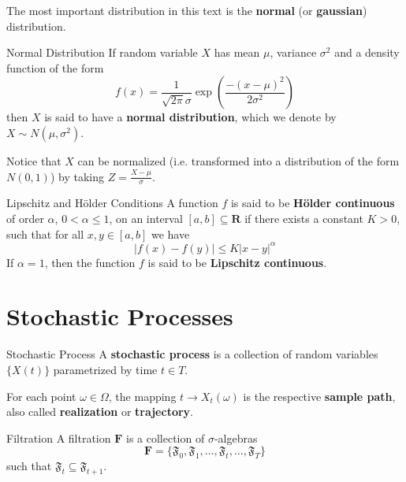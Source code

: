 
The most important distribution in this text is the \textbf{normal} (or \textbf{gaussian}) distribution.
 
\begin{definition}[]{Normal Distribution}{}
	If random variable $X$ has mean $\mu$, variance $\sigma^2$ and a density function of the form
	\[
		f(x) = \frac{1}{\sqrt{2\pi} \sigma} \exp \left( \frac{-(x-\mu)^2}{2\sigma^2} \right) 
	\]
	then $X$ is said to have a \textbf{normal distribution}, which we denote by $X \sim N(\mu, \sigma^2)$.
\end{definition}

Notice that $X$ can be normalized (i.e. transformed into a distribution of the form $N(0,1)$) by taking $Z = \frac{X-\mu}{\sigma}$.


\begin{definition}[]{Lipschitz and H\"older Conditions}{}
	A function $f$ is said to be \textbf{H\"older continuous} of order $\alpha$, $0 < \alpha \leq 1$, on an interval $[a,b] \subseteq \textbf{R}$ if there exists a constant $K > 0$, such that for all $x,y \in [a,b]$ we have
	\[
		|f(x) - f(y)| \leq K |x-y|^{\alpha}
	\]
	If $\alpha = 1$, then the function $f$ is said to be \textbf{Lipschitz continuous}.
\end{definition}

\section{Stochastic Processes}

\begin{definition}[]{Stochastic Process}{}
	A \textbf{stochastic process} is a collection of random variables $\{ X(t) \}$ parametrized by time $t \in T$.  
	
	For each point $\omega \in \Omega$, the mapping $t \longrightarrow X_t(\omega)$ is the respective \textbf{sample path}, also called \textbf{realization} or \textbf{trajectory}.
\end{definition}

\begin{definition}[]{Filtration}{}
	A filtration $\textbf{F}$ is a collection of $\sigma$-algebras
	\[
		\textbf{F} = \{ \mathfrak{F}_0, \mathfrak{F}_1, \ldots, \mathfrak{F}_t, \ldots, \mathfrak{F}_T \}
	\]
	such that $\mathfrak{F}_t \subseteq \mathfrak{F}_{t+1}$.
\end{definition}


